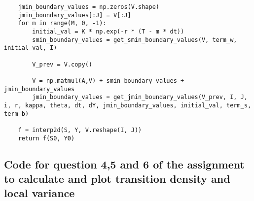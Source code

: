 \documentclass{article}
\begin{document}
\begin{lstlisting}
    jmin_boundary_values = np.zeros(V.shape)
    jmin_boundary_values[:J] = V[:J]
    for m in range(M, 0, -1):
        initial_val = K * np.exp(-r * (T - m * dt))
        smin_boundary_values = get_smin_boundary_values(V, term_w, initial_val, I)

        V_prev = V.copy()

        V = np.matmul(A,V) + smin_boundary_values + jmin_boundary_values
        jmin_boundary_values = get_jmin_boundary_values(V_prev, I, J, i, r, kappa, theta, dt, dY, jmin_boundary_values, initial_val, term_s, term_b)

    f = interp2d(S, Y, V.reshape(I, J))
    return f(S0, Y0)
\end{lstlisting}
\newpage
\subsection{Code for question 4,5 and 6 of the assignment to calculate and plot transition density and local variance }
\end{document}
